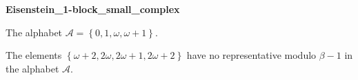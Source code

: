 \begin{exmp}
\textbf{ Eisenstein\_1-block\_small\_complex }

\label{ex:Eisenstein1-blocksmallcomplex}

The alphabet $\mathcal{A} =\left\{0, 1, \omega, \omega + 1\right\}$.

The elements $ \left\{\omega + 2, 2\omega, 2\omega + 1, 2\omega + 2\right\} $ have no representative  modulo $\beta-1$ in the alphabet $\mathcal{A}$.
\end{exmp}